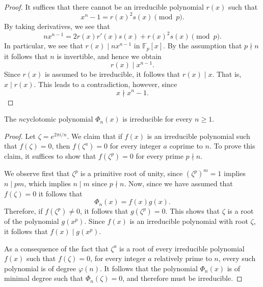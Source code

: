 \begin{proof}
  It suffices that there cannot be an irreducible polynomial $r(x)$ such that
  \begin{equation*}
    x^n-1=r(x)^2s(x)\pmod{p}.
  \end{equation*}
  By taking derivatives, we see that
  \begin{equation*}
    nx^{n-1}=2r(x)r'(x)s(x)+r(x)^2s(x)\pmod{p}.
  \end{equation*}
  In particular, we see that $r(x)\mid nx^{n-1}$ in $\mathbb{F}_p[x]$. By the assumption that $p\nmid n$ it follows that $n$ is invertible, and hence we obtain
  \begin{equation*}
    r(x)\mid x^{n-1}.
  \end{equation*}
  Since $r(x)$ is assumed to be irreducible, it follows that $r(x)\mid x$. That is, $x\mid r(x)$. This leads to a contradiction, however, since
  \begin{equation*}
    x\nmid x^n-1.
  \end{equation*}
\end{proof}

\begin{theorem}
  The $n$\supth cyclotomic polynomial $\Phi_n(x)$ is irreducible for every $n\geq 1$.
\end{theorem}

\begin{proof}
  Let $\zeta=e^{2\pi i/n}$. We claim that if $f(x)$ is an irreducible polynomial such that $f(\zeta)=0$, then $f(\zeta^a)=0$ for every integer $a$ coprime to $n$. To prove this claim, it suffices to show that $f(\zeta^p)=0$ for every prime $p\nmid n$. 

  We observe first that $\zeta^p$ is a primitive root of unity, since $(\zeta^p)^m=1$ implies $n\mid pm$, which implies $n\mid m$ since $p\nmid n$. Now, since we have assumed that $f(\zeta)=0$ it follows that
  \begin{equation*}
    \Phi_n(x)=f(x)g(x).
  \end{equation*}
Therefore, if $f(\zeta^p)\neq 0$, it follows that $g(\zeta^p)=0$. This shows that $\zeta$ is a root of the polynomial $g(x^p)$. Since $f(x)$ is an irreducible polynomial with root $\zeta$, it follows that $f(x)\mid g(x^p)$.

  As a consequence of the fact that $\zeta^a$ is a root of every irreducible polynomial $f(x)$ such that $f(\zeta)=0$, for every integer $a$ relatively prime to $n$, every such polynomial is of degree $\varphi(n)$. It follows that the polynomial $\Phi_n(x)$ is of minimal degree such that $\Phi_n(\zeta)=0$, and therefore must be irreducible.
\end{proof}

